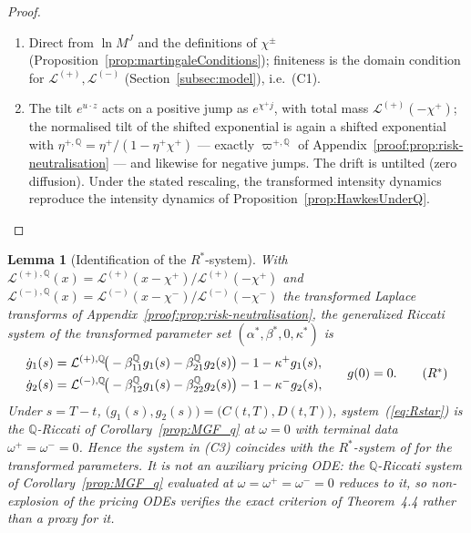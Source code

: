 \documentclass[11pt,a4paper]{article}
\numberwithin{equation}{section}
\newtheorem{lemma}[theorem]{Lemma}
\theoremstyle{remark}
\theoremstyle{definition}
\newcommand{\q}{{\mathbb Q}}
\newcommand{\Lp}{\mathcal{L}^{(+)}}
\newcommand{\Lm}{\mathcal{L}^{(-)}}
\newcommand{\LpQ}{\mathcal{L}^{(+),\q}}
\newcommand{\LmQ}{\mathcal{L}^{(-),\q}}
\begin{document}
{\begin{proof}
\begin{enumerate}[label=(\alph*)]
$(Y_1,Y_2)$; the sign conditions $\beta_{11},\beta_{21}\ge0$,
$\beta_{12},\beta_{22}\le0$ with
$j>\nu^{+}>0$ and $j<\nu^{-}<0$ keep the state space invariant. Conservativeness follows as in (i) of
Lemma~\ref{lemma:1}.
\item Direct from $\ln M^{J}$ and the definitions of $\chi^{\pm}$ (Proposition~\ref{prop:martingaleConditions}); finiteness is the domain condition for $\Lp,\Lm$ (Section~\ref{subsec:model}), i.e.\ (C1).
\item The tilt $e^{u\cdot z}$ acts on a positive jump as $e^{\chi^{+}j}$, with total mass $\Lp(-\chi^{+})$; the normalised tilt of the shifted exponential is again a shifted exponential with $\eta^{+,\q}= \eta^{+}/(1-\eta^{+}\chi^{+})$ --- exactly $\varpi^{+,\q}$ of Appendix~\ref{proof:prop:risk-neutralisation} --- and likewise for negative jumps.
The drift is untilted (zero diffusion).
Under the stated rescaling, the transformed intensity dynamics reproduce the intensity dynamics of   Proposition~\ref{prop:HawkesUnderQ}.
\end{enumerate}
\end{proof}

\begin{lemma}[Identification of the $R^{*}$-system]
  \label{lemma:3}
With $\LpQ(x)=\Lp(x-\chi^{+})/\Lp(-\chi^{+})$ and $\LmQ(x)=\Lm(x-\chi^{-})/\Lm(-\chi^{-})$ the transformed Laplace transforms of Appendix~\ref{proof:prop:risk-neutralisation},
the generalized Riccati system of the transformed parameter set $(\alpha^{*},\beta^{*},0,\kappa^{*})$ is
\begin{equation}
    \begin{aligned}
    \dot g_1(s)&=\LpQ\!\big(-\beta^{\q}_{11}g_1(s)-\beta^{\q}_{21}g_2(s)\big)-1-\kappa^{+}g_1(s),\\
    \dot g_2(s)&=\LmQ\!\big(-\beta^{\q}_{12}g_1(s)-\beta^{\q}_{22}g_2(s)\big)-1-\kappa^{-}g_2(s),
    \end{aligned}\qquad g(0)=0.\tag{\text{$R^{*}$}}
    \label{eq:Rstar}
\end{equation}
Under $s=T-t$, $\big(g_1(s),g_2(s)\big)=\big(C(t,T),D(t,T)\big)$,
system~(\ref{eq:Rstar}) is the $\q$-Riccati of
Corollary~\ref{prop:MGF_q} at $\omega=0$ with terminal data
$\omega^{+}=\omega^{-}=0$.
Hence the system in \textup{(C3)} coincides with the $R^{*}$-system of \cite{Mayerhofer2011} for the transformed parameters. It is not an auxiliary pricing ODE: the $\q$-Riccati system of Corollary~\ref{prop:MGF_q} evaluated at $\omega=\omega^{+}=\omega^{-}=0$ reduces to it, so non-explosion of the pricing ODEs verifies the exact criterion of Theorem~4.4 rather than a proxy for it.
\end{lemma}

}
\end{document}

